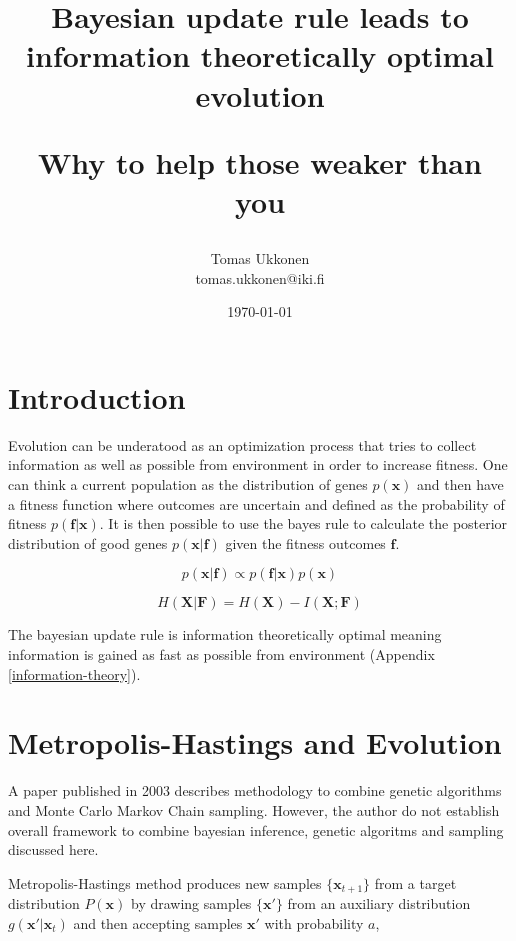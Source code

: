 \documentclass{article}
\title{Bayesian update rule leads to information theoretically optimal evolution\\ \begin{normalsize}Why to help those weaker than you\end{normalsize} }
\author{Tomas Ukkonen\\ \textrm{tomas.ukkonen@iki.fi} }
\date{\today}
\begin{document}
\maketitle

\section{Introduction} \label{introduction}

Evolution can be underatood as an optimization process that tries to collect information  \cite{infobook03} as well as possible from environment in order to increase fitness. One can think a current population as the distribution of genes $p(\mathbf{x})$ and then have a fitness function where outcomes are uncertain and defined as the probability of fitness $p(\mathbf{f}|\mathbf{x})$. It is then possible to use the bayes rule \cite{bdanalysis03} to calculate the posterior distribution of good genes $p(\mathbf{x}|\mathbf{f})$ given the fitness outcomes $\mathbf{f}$.

\begin{equation}
\label{bayesupdate}
p(\mathbf{x}|\mathbf{f}) \propto p(\mathbf{f}|\mathbf{x})p(\mathbf{x}) \end{equation}

\begin{equation}
\label{entropyupdate}
H(\mathbf{X}|\mathbf{F}) = H(\mathbf{X}) - I(\mathbf{X};\mathbf{F})
\end{equation}

The bayesian update rule is information theoretically optimal meaning information is gained as fast as possible from environment (Appendix \ref{information-theory}).

\section{Metropolis-Hastings and Evolution} \label{metropolis-hastings}

A paper published in 2003 \cite{strens03} describes methodology to combine genetic algorithms and Monte Carlo Markov Chain sampling. However, the author do not establish overall framework to combine bayesian inference, genetic algoritms and sampling discussed here.

Metropolis-Hastings method \cite{bdanalysis03} produces new samples $\{\mathbf{x}_{t+1}\}$ from a target distribution $P(\mathbf{x})$ by drawing samples $\{\mathbf{x}'\}$ from an auxiliary distribution $g(\mathbf{x}'|\mathbf{x}_t)$ and then accepting samples $\mathbf{x}'$ with probability $a$,
\end{document}
